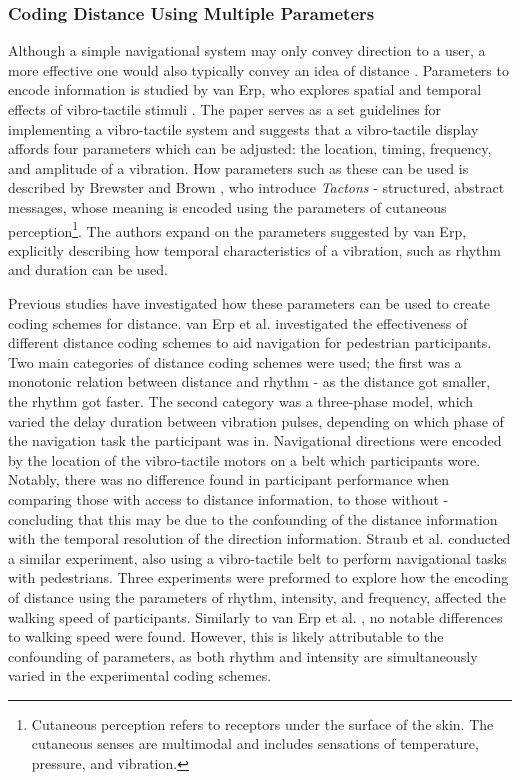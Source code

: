\documentclass{interim}
\begin{document}
\subsubsection{Coding Distance Using Multiple Parameters}\label{sec:coding-distance}
Although a simple navigational system may only convey direction to a user, a more effective one would also typically convey an idea of distance \cite{burntt2002empirical}. Parameters to encode information is studied by van Erp, who explores spatial and temporal effects of vibro-tactile stimuli \cite{guidelines}. The paper serves as a set guidelines for implementing a vibro-tactile system and suggests that a vibro-tactile display affords four parameters which can be adjusted: the location, timing, frequency, and amplitude of a vibration. How parameters such as these can be used is described by Brewster and Brown \cite{10.5555/976310.976313}, who introduce \textit{Tactons} - structured, abstract messages, whose meaning is encoded using the parameters of cutaneous perception\footnote{Cutaneous perception refers to receptors under the surface of the skin. The cutaneous senses are multimodal and includes sensations of temperature, pressure, and vibration.}. The authors expand on the parameters suggested by van Erp, explicitly describing how temporal characteristics of a vibration, such as rhythm and duration can be used.

Previous studies have investigated how these parameters can be used to create coding schemes for distance. van Erp et al. \cite{10.1145/1060581.1060585} investigated the effectiveness of different distance coding schemes to aid navigation for pedestrian participants. Two main categories of distance coding schemes were used; the first was a monotonic relation between distance and rhythm - as the distance got smaller, the rhythm got faster. The second category was a three-phase model, which varied the delay duration between vibration pulses, depending on which phase of the navigation task the participant was in. Navigational directions were encoded by the location of the vibro-tactile motors on a belt which participants wore. Notably, there was no difference found in participant performance when comparing those with access to distance information, to those without - concluding that this may be due to the confounding of the distance information with the temporal resolution of the direction information. Straub et al. \cite{5326374} conducted a similar experiment, also using a vibro-tactile belt to perform navigational tasks with pedestrians. Three experiments were preformed to explore how the encoding of distance using the parameters of rhythm, intensity, and frequency, affected the walking speed of participants. Similarly to van Erp et al. \cite{10.1145/1060581.1060585}, no notable differences to walking speed were found. However, this is likely attributable to the confounding of parameters, as both rhythm and intensity are simultaneously varied in the experimental coding schemes.
\end{document}
